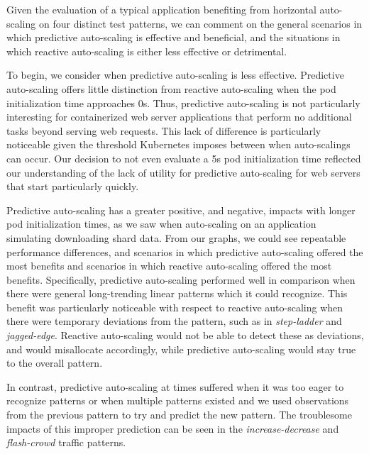 Given the evaluation of a typical application benefiting from horizontal
auto-scaling on four distinct test patterns, we can comment on the general
scenarios in which predictive auto-scaling is effective and beneficial, and the
situations in which reactive auto-scaling is either less effective or
detrimental.

To begin, we consider when predictive auto-scaling is less
effective. Predictive auto-scaling offers little distinction from reactive
auto-scaling when the pod initialization time approaches 0s. Thus, predictive
auto-scaling is not particularly interesting for containerized web server
applications that perform no additional tasks beyond serving web requests.
This lack of difference is particularly noticeable given the
threshold Kubernetes imposes between when auto-scalings can occur.
Our decision to not even evaluate a 5s pod initialization time reflected our
understanding of the lack of utility for predictive auto-scaling for web servers
that start particularly quickly.

Predictive auto-scaling has a greater positive, and negative, impacts
with longer pod initialization times, as we saw when auto-scaling on an
application simulating downloading shard data. From our graphs, we could see
repeatable performance differences, and scenarios in which predictive
auto-scaling offered the most benefits and scenarios in which reactive
auto-scaling offered the most benefits. Specifically, predictive auto-scaling
performed well in comparison when there were general long-trending linear
patterns which it could recognize. This benefit was particularly noticeable with
respect to reactive auto-scaling when there were temporary deviations from the
pattern, such as in \textit{step-ladder} and \textit{jagged-edge}. Reactive
auto-scaling would not be able to detect these as deviations, and would
misallocate accordingly, while predictive auto-scaling would stay true to the
overall pattern.

In contrast, predictive auto-scaling at times suffered when it was too eager to
recognize patterns or when multiple patterns existed and we used observations
from the previous pattern to try and predict the new pattern. The troublesome
impacts of this improper prediction can be seen in the
\textit{increase-decrease} and \textit{flash-crowd} traffic patterns.

